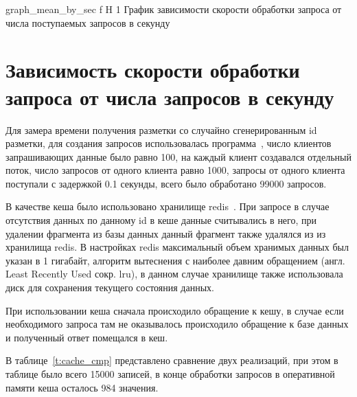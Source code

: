 {graph_mean_by_sec} %
{f} %
{H} %
{1\textwidth} %
{График зависимости скорости обработки запроса от числа поступаемых запросов в секунду} %


\section{Зависимость скорости обработки запроса от числа запросов в секунду}

Для замера времени получения разметки со случайно сгенерированным id разметки, для создания запросов  использовалась программа~\cite{JMeter}, число клиентов запрашивающих данные было равно 100, на каждый клиент создавался отдельный поток, число запросов от одного клиента равно 1000, запросы от одного клиента поступали с задержкой 0.1 секунды, всего было обработано 99000 запросов.


В качестве кеша было использовано хранилище redis~\cite{redis}. При запросе в случае отсутствия данных по данному id в кеше данные считывались в него, при удалении фрагмента из базы данных данный фрагмент также удалялся из из хранилища redis. В настройках redis максимальный объем хранимых данных был указан в 1 гигабайт, алгоритм вытеснения с наиболее давним обращением (англ. Least Recently Used сокр. lru), в данном случае хранилище также использовала диск для сохранения текущего состояния данных.

При использовании кеша сначала происходило обращение к кешу, в случае если необходимого запроса там не оказывалось происходило обращение к базе данных и полученный ответ помещался в кеш.

В таблице~\ref{t:cache_cmp}	 представлено сравнение двух реализаций, при этом в таблице было всего 15000 записей, в конце обработки запросов в оперативной памяти кеша осталось 984 значения.

